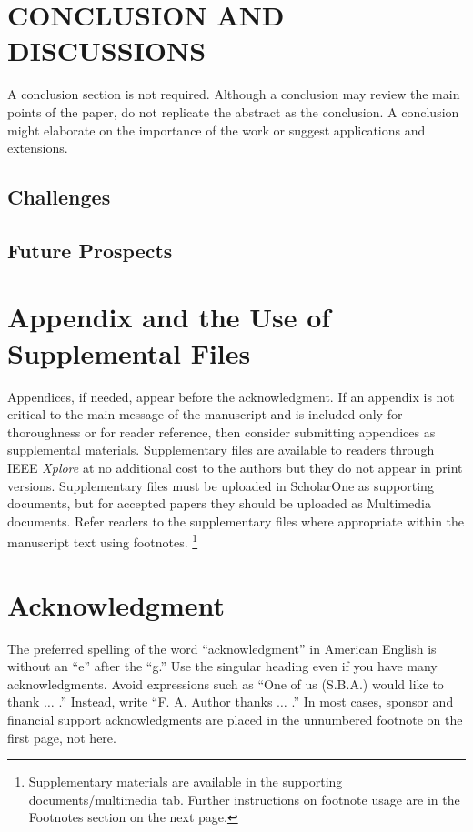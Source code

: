 \documentclass[journal,twoside,web]{ieeecolor}
\begin{document}
\section{CONCLUSION AND DISCUSSIONS}
A conclusion section is not required. Although a conclusion may review the 
main points of the paper, do not replicate the abstract as the conclusion.
A conclusion might elaborate on the importance of the work or suggest 
applications and extensions.
\subsection{Challenges}

\subsection{Future Prospects}





\appendices

\section*{Appendix and the Use of Supplemental Files}
Appendices, if needed, appear before the acknowledgment. If an appendix is not
critical to the main message of the manuscript and is included only for thoroughness
or for reader reference, then consider submitting appendices as supplemental materials.
Supplementary files are available to readers through IEEE \emph{Xplore\textregistered}
at no additional cost to the authors but they do not appear in print versions.
Supplementary files must be uploaded in ScholarOne as supporting documents, but for
accepted papers they should be uploaded as Multimedia documents. Refer readers
to the supplementary files where appropriate within the manuscript text using footnotes.
\footnote{Supplementary materials are available in the supporting documents/multimedia tab.
Further instructions on footnote usage are in the Footnotes section on the next page.}

\section*{Acknowledgment}
The preferred spelling of the word ``acknowledgment'' in American English is 
without an ``e'' after the ``g.'' Use the singular heading even if you have 
many acknowledgments. Avoid expressions such as ``One of us (S.B.A.) would 
like to thank $\ldots$ .'' Instead, write ``F. A. Author thanks $\ldots$ .'' In most 
cases, sponsor and financial support acknowledgments are placed in the 
unnumbered footnote on the first page, not here.




\end{document}
